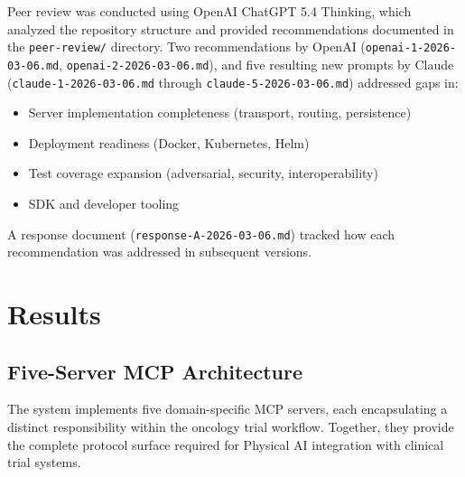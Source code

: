 \documentclass{article}
\begin{document}
Peer review was conducted using OpenAI ChatGPT 5.4 Thinking, which analyzed the repository structure and provided recommendations documented in the \texttt{peer-review/} directory. Two recommendations by OpenAI (\texttt{openai-1-2026-03-06.md}, \texttt{openai-2-2026-03-06.md}), and five resulting new prompts by Claude (\texttt{claude-1-2026-03-06.md} through \texttt{claude-5-2026-03-06.md}) addressed gaps in:

\begin{itemize}[leftmargin=*]
\item Server implementation completeness (transport, routing, persistence)
\item Deployment readiness (Docker, Kubernetes, Helm)
\item Test coverage expansion (adversarial, security, interoperability)
\item SDK and developer tooling
\end{itemize}

A response document (\texttt{response-A-2026-03-06.md}) tracked how each recommendation was addressed in subsequent versions.

\section{Results}
\label{sec:results}

\subsection{Five-Server MCP Architecture}

The system implements five domain-specific MCP servers, each encapsulating a distinct responsibility within the oncology trial workflow. Together, they provide the complete protocol surface required for Physical AI integration with clinical trial systems.
\end{document}
